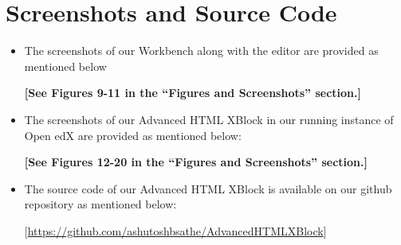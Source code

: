 \section{Screenshots and Source Code}
\begin{itemize}
\item The screenshots of our Workbench along with the editor are provided as mentioned below
\begin{center}\textbf{[See Figures 9-11 in the “Figures and Screenshots” section.]}\end{center}
\item The screenshots of our Advanced HTML XBlock in our running instance of Open edX are
provided as mentioned below:
\begin{center}\textbf{[See Figures 12-20 in the “Figures and Screenshots” section.]}\end{center}
\item The source code of our Advanced HTML XBlock is available on our github repository as
mentioned below:\newline
\begin{center}[\url{https://github.com/ashutoshbsathe/AdvancedHTMLXBlock}]\end{center}
\end{itemize}

